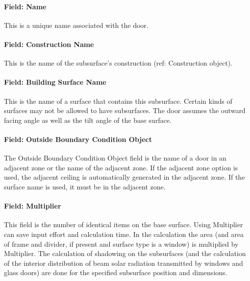 \paragraph{Field: Name}\label{field-name-14-010}

This is a unique name associated with the door.

\paragraph{Field: Construction Name}\label{field-construction-name-14}

This is the name of the subsurface's construction (ref: Construction object).

\paragraph{Field: Building Surface Name}\label{field-building-surface-name-4}

This is the name of a surface that contains this subsurface. Certain kinds of surfaces may not be allowed to have subsurfaces. The door assumes the outward facing angle as well as the tilt angle of the base surface.

\paragraph{Field: Outside Boundary Condition Object}\label{field-outside-boundary-condition-object-4}

The Outside Boundary Condition Object field is the name of a door in an adjacent zone or the name of the adjacent zone. If the adjacent zone option is used, the adjacent ceiling is automatically generated in the adjacent zone. If the surface name is used, it must be in the adjacent zone.

\paragraph{Field: Multiplier}\label{field-multiplier-5}

This field is the number of identical items on the base surface. Using Multiplier can save input effort and calculation time. In the calculation the area (and area of frame and divider, if present and surface type is a window) is multiplied by Multiplier. The calculation of shadowing on the subsurfaces (and the calculation of the interior distribution of beam solar radiation transmitted by windows and glass doors) are done for the specified subsurface position and dimensions.

